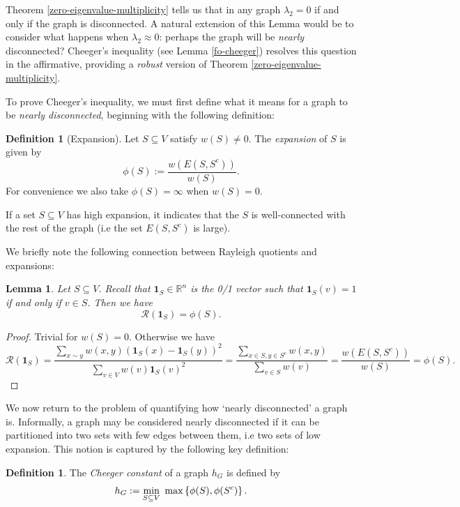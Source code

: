\documentclass[a4paper,11pt]{article}
\newtheorem{lemma}[theorem]{Lemma}
\theoremstyle{definition}
\newtheorem{definition}[theorem]{Definition}
\newcommand{\R}{\mathbb{R}}
\newcommand{\rayleigh}[1]{\mathcal{R}\left(#1\right)}
\newcommand{\rayleighfull}[1]{\frac{\sum_{x \sim y} w(x, y)\left(#1(x) - #1(y)\right)^2}{\sum_{v \in V} w(v)#1(v)^2}}
\begin{document}
Theorem \ref{zero-eigenvalue-multiplicity} tells us that in any graph $\lambda_2 = 0$ if and only if the graph is disconnected. A natural extension of this Lemma would be to consider what happens when $\lambda_2 \approx 0$: perhaps the graph will be \emph{nearly} disconnected? Cheeger's inequality (see Lemma \ref{fo-cheeger}) resolves this question in the affirmative, providing a \emph{robust} version of Theorem \ref{zero-eigenvalue-multiplicity}. 

To prove Cheeger's inequality, we must first define what it means for a graph to be \emph{nearly disconnected}, beginning with the following definition:

\begin{definition}[Expansion]
Let $S \subseteq V$ satisfy $w(S) \ne 0$. The \emph{expansion} of $S$ is given by
\[
\phi(S) := \frac{w(E(S, S^c))}{w(S)}.
\]
For convenience we also take $\phi(S) = \infty$ when $w(S) = 0$.
\end{definition}
If a set $S \subseteq V$ has high expansion, it indicates that the $S$ is well-connected with the rest of the graph (i.e the set $E(S, S^c)$ is large).

\medskip

We briefly note the following connection between Rayleigh quotients and expansions:
\begin{lemma}\label{zero-one-vector-rayleigh}
Let $S \subseteq V$. Recall that $\bm{1}_S \in \R^n$ is the 0/1 vector such that $\bm{1}_S(v) = 1$ if and only if $v \in S$. Then we have
\[
\rayleigh{\bm{1}_S} = \phi(S).
\]
\end{lemma}
\begin{proof}
Trivial for $w(S) = 0$. Otherwise we have
\[
\rayleigh{\bm{1}_S} = \rayleighfull{\bm{1}_S} = \frac{\sum\limits_{x \in S, y \in S^c} w(x, y)}{\sum\limits_{v \in S} w(v)} = \frac{w(E(S, S^c))}{w(S)} = \phi(S).
\]
\end{proof}

We now return to the problem of quantifying how `nearly disconnected' a graph is. Informally, a graph may be considered nearly disconnected if it can be partitioned into two sets with few edges between them, i.e two sets of low expansion. This notion is captured by the following key definition:

\begin{definition}\label{expansion}
The \emph{Cheeger constant} of a graph $h_G$ is defined by \[ h_G := \min_{S \subseteq V} \hspace{0.3em} \max \left\{\phi(S), \phi(S^c)\right\}.\]
\end{definition}
\end{document}

